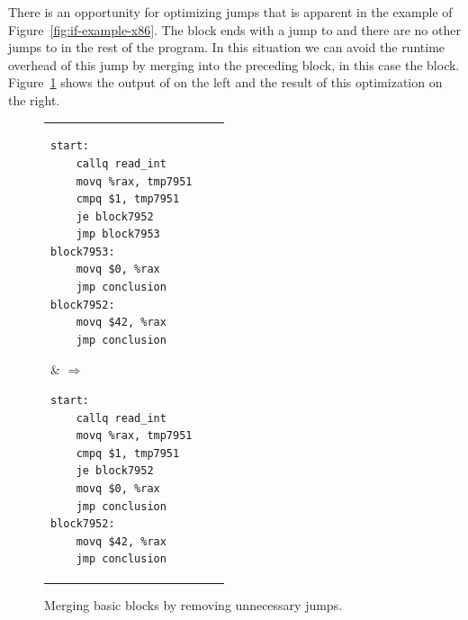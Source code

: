 \documentclass[11pt]{book}
\newtheorem{exercise}[theorem]{Exercise}
\begin{document}


There is an opportunity for optimizing jumps that is apparent in the
example of Figure~\ref{fig:if-example-x86}. The  block
ends with a jump to  and there are no other jumps to
 in the rest of the program. In this situation we can
avoid the runtime overhead of this jump by merging 
into the preceding block, in this case the  block.
Figure~\ref{fig:remove-jumps} shows the output of
 on the left and the result of this
optimization on the right.

\begin{figure}[tbp]
\begin{tabular}{lll}
\begin{minipage}{0.5\textwidth}
\begin{lstlisting}
start:
    callq read_int
    movq %rax, tmp7951
    cmpq $1, tmp7951
    je block7952
    jmp block7953
block7953:
    movq $0, %rax
    jmp conclusion
block7952:
    movq $42, %rax
    jmp conclusion
\end{lstlisting}
\end{minipage}
&
$\Rightarrow\qquad$
\begin{minipage}{0.4\textwidth}
\begin{lstlisting}
start:
    callq read_int
    movq %rax, tmp7951
    cmpq $1, tmp7951
    je block7952
    movq $0, %rax
    jmp conclusion
block7952:
    movq $42, %rax
    jmp conclusion
\end{lstlisting}
\end{minipage}
\end{tabular}
\caption{Merging basic blocks by removing unnecessary jumps.}
\label{fig:remove-jumps}
\end{figure}
\end{document}
